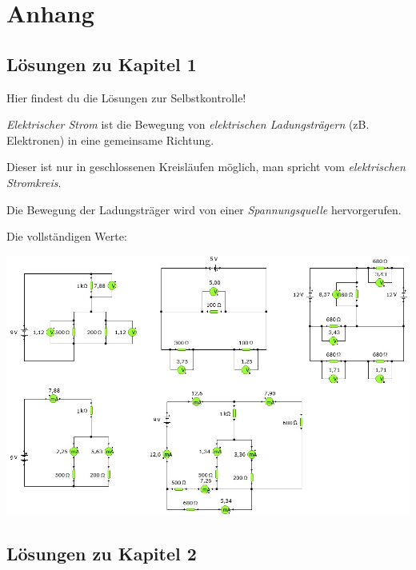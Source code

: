 \chapter{Anhang}

\section{Lösungen zu Kapitel 1}

Hier findest du die Lösungen zur Selbstkontrolle!


\begin{Loesung} \label{Loes:Strom}
\emph{Elektrischer Strom} ist die Bewegung von \emph{elektrischen Ladungsträgern} (zB. Elektronen) in eine gemeinsame Richtung.

Dieser ist nur in  geschlossenen Kreisläufen möglich, man spricht vom \emph{elektrischen Stromkreis}.

Die Bewegung der Ladungsträger wird von einer \emph{Spannungsquelle} hervorgerufen.
\end{Loesung}


\begin{Loesung}
Die vollständigen Werte:
\begin{center}
\includegraphics[scale=.65]{pics/Kirchhoffloes}
\end{center}

\end{Loesung}


\section{Lösungen zu Kapitel 2}

